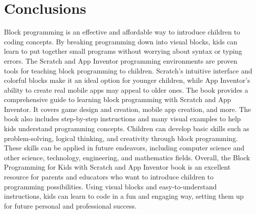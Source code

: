 \chapter*{Conclusions}
\thispagestyle{empty}

Block programming is an effective and affordable way to introduce children to coding concepts. By breaking programming down into visual blocks, kids can learn to put together small programs without worrying about syntax or typing errors. The Scratch and App Inventor programming environments are proven tools for teaching block programming to children. Scratch's intuitive interface and colorful blocks make it an ideal option for younger children, while App Inventor's ability to create real mobile apps may appeal to older ones. The book provides a comprehensive guide to learning block programming with Scratch and App Inventor. It covers game design and creation, mobile app creation, and more. The book also includes step-by-step instructions and many visual examples to help kids understand programming concepts. Children can develop basic skills such as problem-solving, logical thinking, and creativity through block programming. These skills can be applied in future endeavors, including computer science and other science, technology, engineering, and mathematics fields. Overall, the Block Programming for Kids with Scratch and App Inventor book is an excellent resource for parents and educators who want to introduce children to programming possibilities. Using visual blocks and easy-to-understand instructions, kids can learn to code in a fun and engaging way, setting them up for future personal and professional success.

